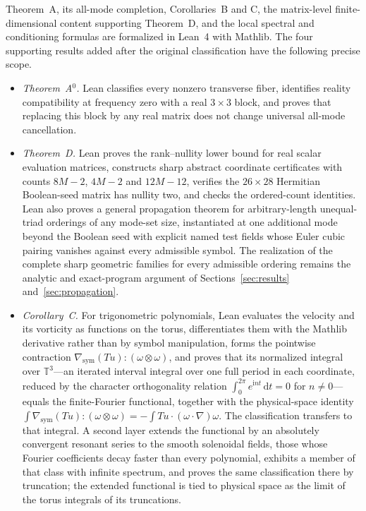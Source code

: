 \documentclass[11pt]{article}
\theoremstyle{definition}
\theoremstyle{remark}
\theoremstyle{plain}
\newcommand{\gsym}{\nabla_{\mathrm{sym}}}
\begin{document}
Theorem~A, its all-mode completion, Corollaries~B and C, the matrix-level
finite-dimensional content supporting Theorem~D, and the local spectral and
conditioning formulas are formalized in Lean~4 with Mathlib. The four
supporting results added after the original classification have the following
precise scope.
\begin{itemize}
\item \emph{Theorem~A$^{0}$.} Lean classifies every nonzero transverse
fiber, identifies reality compatibility at frequency zero with a real
$3\times3$ block, and proves that replacing this block by any real matrix
does not change universal all-mode cancellation.
\item \emph{Theorem~D.} Lean proves the rank--nullity lower bound for real
scalar evaluation matrices, constructs sharp abstract coordinate
certificates with counts $8M-2$, $4M-2$ and $12M-12$, verifies the
$26\times28$ Hermitian Boolean-seed matrix has nullity two, and checks the
ordered-count identities. Lean also proves a general propagation theorem
for arbitrary-length unequal-triad orderings of any mode-set size, instantiated
at one additional mode beyond the Boolean seed with explicit named test
fields whose Euler cubic pairing vanishes against every admissible symbol.
The realization of the complete sharp geometric families for every admissible
ordering remains the analytic and exact-program argument of
Sections~\ref{sec:results} and~\ref{sec:propagation}.
\item \emph{Corollary~C.} For trigonometric polynomials, Lean evaluates the
velocity and its vorticity as functions on the torus, differentiates them with
the Mathlib derivative rather than by symbol manipulation, forms the pointwise
contraction $\gsym(Tu):(\omega\otimes\omega)$, and proves that its normalized
integral over $\mathbb{T}^{3}$---an iterated interval integral over one full
period in each coordinate, reduced by the character orthogonality relation
$\int_{0}^{2\pi}e^{\mathrm{i}nt}\,\mathrm{d}t=0$ for $n\neq0$---equals the
finite-Fourier functional, together with the physical-space identity
$\int\gsym(Tu):(\omega\otimes\omega)=-\int Tu\cdot(\omega\cdot\nabla)\omega$.
The classification transfers to that integral. A second layer extends the
functional by an absolutely convergent resonant series to the smooth
solenoidal fields, those whose Fourier coefficients decay faster than every
polynomial, exhibits a member of that class with infinite spectrum, and proves
the same classification there by truncation; the extended functional is tied
to physical space as the limit of the torus integrals of its truncations.

\end{itemize}
\end{document}
